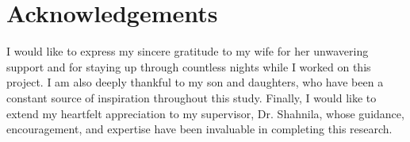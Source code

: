 \chapter*{Acknowledgements}
I would like to express my sincere gratitude to my wife for her unwavering support and for staying up through countless nights while I worked on this project. I am also deeply thankful to my son and daughters, who have been a constant source of inspiration throughout this study. Finally, I would like to extend my heartfelt appreciation to my supervisor, Dr. Shahnila, whose guidance, encouragement, and expertise have been invaluable in completing this research.